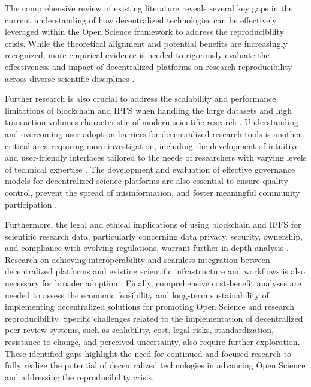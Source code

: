 \documentclass{article}
\begin{document}
The comprehensive review of existing literature reveals several key gaps in the current understanding of how decentralized technologies can be effectively leveraged within the Open Science framework to address the reproducibility crisis. While the theoretical alignment and potential benefits are increasingly recognized, more empirical evidence is needed to rigorously evaluate the effectiveness and impact of decentralized platforms on research reproducibility across diverse scientific disciplines \cite{garcia2021decentralized}.

Further research is also crucial to address the scalability and performance limitations of blockchain and IPFS when handling the large datasets and high transaction volumes characteristic of modern scientific research \cite{xu2019scalability}. Understanding and overcoming user adoption barriers for decentralized research tools is another critical area requiring more investigation, including the development of intuitive and user-friendly interfaces tailored to the needs of researchers with varying levels of technical expertise \cite{fecher2017academic}. The development and evaluation of effective governance models for decentralized science platforms are also essential to ensure quality control, prevent the spread of misinformation, and foster meaningful community participation \cite{bartling2014opening}.

Furthermore, the legal and ethical implications of using blockchain and IPFS for scientific research data, particularly concerning data privacy, security, ownership, and compliance with evolving regulations, warrant further in-depth analysis \cite{finck2018blockchain}. Research on achieving interoperability and seamless integration between decentralized platforms and existing scientific infrastructure and workflows is also necessary for broader adoption \cite{bogaard2020interoperability}. Finally, comprehensive cost-benefit analyses are needed to assess the economic feasibility and long-term sustainability of implementing decentralized solutions for promoting Open Science and research reproducibility. Specific challenges related to the implementation of decentralized peer review systems, such as scalability, cost, legal risks, standardization, resistance to change, and perceived uncertainty, also require further exploration. These identified gaps highlight the need for continued and focused research to fully realize the potential of decentralized technologies in advancing Open Science and addressing the reproducibility crisis.
\end{document}
